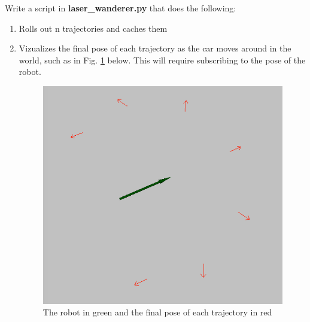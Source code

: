 \documentclass[final]{article}
\begin{document}
Write a script in \textbf{laser\_wanderer.py} that does the following:
\begin{enumerate}
\item Rolls out n trajectories and caches them
\item Vizualizes the final pose of each trajectory as the car moves around in the world, such as in Fig. \ref{fig:rollouts} below. This will require subscribing to the pose of the robot.

\begin{figure}[h]
\centering
\includegraphics[width=0.45\linewidth]{figs/rollouts.png}
\caption{The robot in green and the final pose of each trajectory in red}
\label{fig:rollouts}
\end{figure}
 

\end{enumerate}
\end{document}
